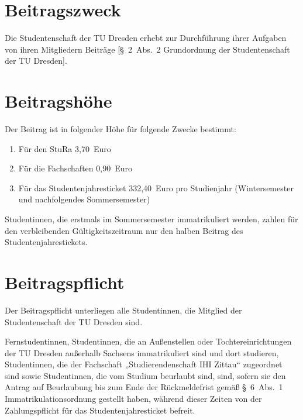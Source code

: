 

\setcounter{section}{0}
\begin{multicols}{2}
 

\section{Beitragszweck}

\Abs \Satz  Die Studentenschaft der TU Dresden erhebt zur Durchführung ihrer Aufgaben von ihren Mitgliedern Beiträge [§~2~Abs.~2 Grundordnung der Studentenschaft der TU Dresden]. 

\section{Beitragshöhe}

\Abs \Satz  Der Beitrag ist in folgender Höhe für folgende Zwecke bestimmt:
\begin{enumerate}
\item Für den StuRa 3,70~Euro
\item Für die Fachschaften 0,90~Euro
\item Für das Studentenjahresticket 332,40~Euro pro Studienjahr (Wintersemester und nachfolgendes Sommersemester)
\end{enumerate}

\Abs \Satz  Studentinnen, die erstmals im Sommersemester immatrikuliert werden, zahlen für den verbleibenden Gültigkeitszeitraum nur den halben Beitrag des Studentenjahrestickets. 


\section{Beitragspflicht}

\Abs \Satz  Der Beitragspflicht unterliegen alle Studentinnen, die Mitglied der Studentenschaft der TU Dresden sind.

\Abs \Satz  Fernstudentinnen, Studentinnen, die an Außenstellen oder Tochtereinrichtungen der TU Dresden außerhalb Sachsens immatrikuliert sind und dort studieren, Studentinnen, die der Fachschaft „Studierendenschaft IHI Zittau“ zugeordnet sind sowie Studentinnen, die vom Studium beurlaubt sind, sind, sofern sie den Antrag auf Beurlaubung bis zum Ende der Rückmeldefrist gemäß §~6~Abs.~1 Immatrikulationsordnung gestellt haben, während dieser Zeiten von der Zahlungspflicht für das Studentenjahresticket befreit. 



\end{multicols}
